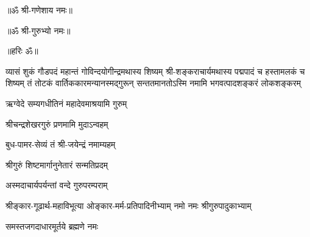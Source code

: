 

\centerline{॥ॐ श्री-गणेशाय नमः॥}
\centerline{॥ॐ श्री-गुरुभ्यो नमः॥}
\centerline{॥हरिः ॐ॥}


\setlength{\shlokaspaceskip}{0pt}
%
{व्यासं शुकं गौडपदं महान्तं गोविन्दयोगीन्द्रमथास्य शिष्यम्}%
{श्री-शङ्कराचार्यमथास्य पद्मपादं च हस्तामलकं च शिष्यम्}%
{तं तोटकं वार्तिककारमन्यानस्मद्गुरून् सन्ततमानतोऽस्मि}%
\setlength{\shlokaspaceskip}{24pt}
{नमामि भगवत्पादशङ्करं लोकशङ्करम्}

{ऋग्वेदे सम्यगधीतिनं महादेवमाश्रयामि गुरुम्}

{श्रीचन्द्रशेखरगुरुं प्रणमामि मुदाऽन्वहम्}

{बुध-पामर-सेव्यं तं श्री-जयेन्द्रं नमाम्यहम्} 

{श्रीगुरुं शिष्टमार्गानुनेतारं सन्मतिप्रदम्}

{अस्मदाचार्यपर्यन्तां वन्दे गुरुपरम्पराम्}

{श्रीङ्कार-गूढार्थ-महाविभूत्या}
{ओङ्कार-मर्म-प्रतिपादिनीभ्याम्}
{नमो नमः श्रीगुरुपादुकाभ्याम्}

{समस्तजगदाधारमूर्तये ब्रह्मणे नमः}
